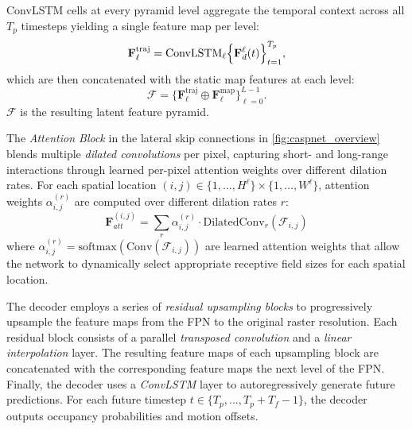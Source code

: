 \begin{description}[leftmargin=1em,itemsep=2pt]
\item[Temporal fusion.] ConvLSTM cells at every pyramid level aggregate the temporal context across all \(T_p\) timesteps yielding a single feature map per level:
\begin{equation}
\label{eq:fpn_fusion_traj}
\mathbf{F}_{\ell}^{\mathrm{traj}}
= \mathrm{ConvLSTM}_\ell\Bigl\{\mathbf{F}^{\ell}_{d}(t)\Bigr\}_{t=1}^{T_p},
\end{equation}
which are then concatenated with the static map features at each level:
\begin{equation}
\label{eq:fpn_fusion}
\boldsymbol{\mathcal{F}}=\{\mathbf{F}_\ell^{\mathrm{traj}}\oplus \mathbf{F}_\ell^{\mathrm{map}}\}_{\ell=0}^{L-1}.
\end{equation}
\( \boldsymbol{\mathcal{F}} \) is the resulting latent feature pyramid.

\item[Pixel-adaptive attention.] The \emph{Attention Block} in the lateral skip connections in \autoref{fig:caspnet_overview} blends multiple \emph{dilated convolutions}\cite{dilatedConv21} per pixel, capturing short- and long-range interactions through learned per-pixel attention weights over different dilation rates. For each spatial location \((i,j) \in \{1,\dots,H^{\ell}\} \times \{1,\dots,W^{\ell}\}\), attention weights \(\alpha_{i,j}^{(r)}\) are computed over different dilation rates \( r \):
\begin{equation}
\label{eq:pixel_attention}
\mathbf{F}_{att}^{(i,j)} = \sum_{r} \alpha_{i,j}^{(r)} \cdot \text{DilatedConv}_r(\boldsymbol{\mathcal{F}}_{i,j})
\end{equation}
where \(\alpha_{i,j}^{(r)} = \text{softmax}(\text{Conv}(\boldsymbol{\mathcal{F}}_{i,j}))\) are learned attention weights that allow the network to dynamically select appropriate receptive field sizes for each spatial location.

\item[Grid-based decoder.] The decoder employs a series of \emph{residual upsampling blocks} to progressively upsample the feature maps from the FPN to the original raster resolution. Each residual block consists of a parallel \emph{transposed convolution} and a \emph{linear interpolation} layer. The resulting feature maps of each upsampling block are concatenated with the corresponding feature maps the next level of the FPN.\\
Finally, the decoder uses a \emph{ConvLSTM} layer to autoregressively generate future predictions. For each future timestep \(t \in \{T_p, \ldots, T_p + T_f - 1\}\), the decoder outputs occupancy probabilities and motion offsets.


\end{description}
